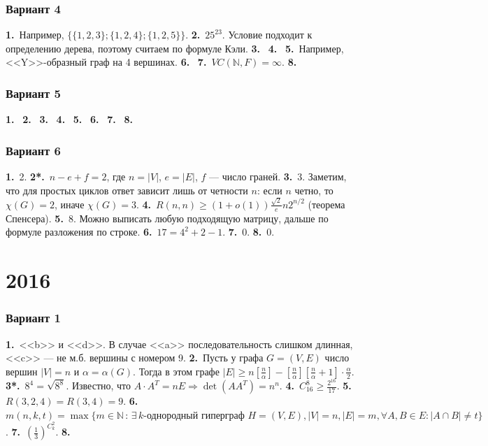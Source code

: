 \documentclass[oneside]{book}
\begin{document}
\subsubsection{Вариант 4}

\textbf{1.}~Например, $\{\{1,2,3\}; \{1,2,4\}; \{1,2,5\}\}$.
\textbf{2.}~$25^{23}$. Условие подходит к определению дерева, поэтому считаем по формуле Кэли.
\textbf{3.}~
\textbf{4.}~
\textbf{5.}~Например, <<Y>>-образный граф на 4 вершинах.
\textbf{6.}~
\textbf{7.}~$VC(\mathbb{N}, F) = \infty$.  
\textbf{8.}~
\subsubsection{Вариант 5}

\textbf{1.}~
\textbf{2.}~
\textbf{3.}~
\textbf{4.}~
\textbf{5.}~
\textbf{6.}~
\textbf{7.}~
\textbf{8.}~

\subsubsection{Вариант 6}

\textbf{1.}~2.
\textbf{2*.}~$n - e + f = 2$, где $n = |V|$, $e = |E|$, $f$ --- число граней.
\textbf{3.}~3. Заметим, что для простых циклов ответ зависит лишь от четности $n$: если $n$ четно, то $\chi(G) = 2$, иначе $\chi(G) = 3$.
\textbf{4.}~$R(n, n) \geqslant \displaystyle (1+o(1)) \frac{\sqrt{2}}{e}n2^{n/2}$ (теорема Спенсера).
\textbf{5.}~8. Можно выписать любую  подходящую матрицу, дальше по формуле разложения по строке.
\textbf{6.}~$17 = 4^2 + 2 - 1$.
\textbf{7.}~0.
\textbf{8.}~0.

\section{2016}
\subsubsection{Вариант 1}

\textbf{1.}~<<b>> и <<d>>.  В случае <<a>> последовательность слишком длинная, <<c>> --- не м.б. вершины с номером 9.
\textbf{2.}~Пусть у графа $G = (V, E)$ число вершин $|V| = n$ и $\alpha = \alpha(G)$. Тогда в этом графе \mbox{$\displaystyle |E| \geqslant n\left[\frac{n}{\alpha}\right] - \left[\frac{n}{\alpha}\right]\left[\frac{n}{\alpha} + 1\right]\cdot\frac{\alpha}{2}$}.
\textbf{3*.}~$8^4 = \sqrt{8^8}$.  Известно, что $A \cdot A^T = nE \Rightarrow \det(AA^T) = n^n$.
\textbf{4.}~$C_{16}^8 \geqslant \frac{2^{16}}{17}$.
\textbf{5.}~$R(3, 2, 4)=R(3, 4) = 9$.
\textbf{6.}~$m(n, k, t) = \max\{m \in \mathbb{N}\,\colon\,\exists\,k\text{-однородный гиперграф } H = (V, E), |V| = n, |E| = m, \forall A, B \in E \colon |A \cap B| \neq t \}$.
\textbf{7.}~$\left(\frac{1}{3}\right)^{C_k^2}$.
\textbf{8.}~
\end{document}
